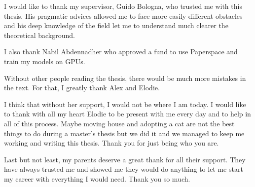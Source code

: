 \documentclass[
11pt, %
english, %
singlespacing, %
liststotoc, %
parskip, %
headsepline, %
]{MastersDoctoralThesis} %
\begin{document}
\begin{acknowledgements}
\addchaptertocentry{\acknowledgementname} %

I would like to thank my supervisor, Guido Bologna, who trusted me with this thesis. His pragmatic advices allowed me to face more easily different obstacles and his deep knowledge of the field let me to understand much clearer the theoretical background.

I also thank Nabil Abdennadher who approved a fund to use Paperspace and train my models on GPUs.

Without other people reading the thesis, there would be much more mistakes in the text. For that, I greatly thank Alex and Elodie.

I think that without her support, I would not be where I am today. I would like to thank with all my heart Elodie to be present with me every day and to help in all of this process. Maybe  moving house and adopting a cat are not the best things to do during a master's thesis but we did it and we managed to keep me working and writing this thesis. Thank you for just being who you are.

Last but not least, my parents deserve a great thank for all their support. They have always trusted me and showed me they would do anything to let me start my career with everything I would need. Thank you so much.

\end{acknowledgements}


\tableofcontents %

\listoffigures %

\listoftables %

\end{document}
